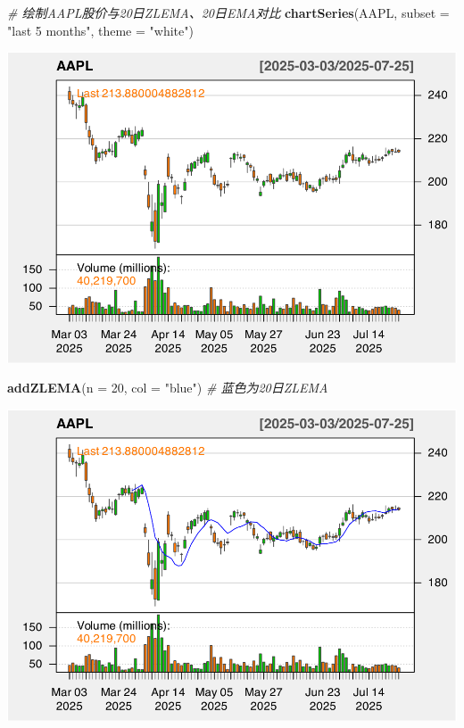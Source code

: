 \documentclass[]{ctexbook}
\newenvironment{Shaded}{\begin{snugshade}}{\end{snugshade}}
\newcommand{\AttributeTok}[1]{\textcolor[rgb]{0.13,0.29,0.53}{#1}}
\newcommand{\CommentTok}[1]{\textcolor[rgb]{0.56,0.35,0.01}{\textit{#1}}}
\newcommand{\DecValTok}[1]{\textcolor[rgb]{0.00,0.00,0.81}{#1}}
\newcommand{\FunctionTok}[1]{\textcolor[rgb]{0.13,0.29,0.53}{\textbf{#1}}}
\newcommand{\NormalTok}[1]{#1}
\newcommand{\StringTok}[1]{\textcolor[rgb]{0.31,0.60,0.02}{#1}}
\begin{document}
\begin{Shaded}
\begin{Highlighting}[]
\CommentTok{\# 绘制AAPL股价与20日ZLEMA、20日EMA对比}
\FunctionTok{chartSeries}\NormalTok{(AAPL, }\AttributeTok{subset =} \StringTok{"last 5 months"}\NormalTok{, }\AttributeTok{theme =} \StringTok{"white"}\NormalTok{)}
\end{Highlighting}
\end{Shaded}

\includegraphics[width=0.9\linewidth]{QuantmodHandbook_files/figure-latex/zlema-1}

\begin{Shaded}
\begin{Highlighting}[]
\FunctionTok{addZLEMA}\NormalTok{(}\AttributeTok{n =} \DecValTok{20}\NormalTok{, }\AttributeTok{col =} \StringTok{"blue"}\NormalTok{)   }\CommentTok{\# 蓝色为20日ZLEMA}
\end{Highlighting}
\end{Shaded}

\includegraphics[width=0.9\linewidth]{QuantmodHandbook_files/figure-latex/zlema-2}
\end{document}
